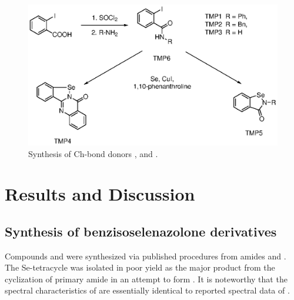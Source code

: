 \begin{refsection}
\begin{figure}
  \centering
  \includegraphics[scale=0.74]{Figures/catalytic-synthesis.eps}
  \caption{Synthesis of Ch-bond donors ,  and .}
  \label{fig:synthesis}
\end{figure}

\section{Results and Discussion}
\subsection{Synthesis of benzisoselenazolone derivatives }
Compounds  and  were synthesized via published procedures from amides  and .\autocite{Bhabak2010}
The Se-tetracycle  was isolated in poor yield as the major product from the cyclization of primary amide  in an attempt to form .
It is noteworthy that the spectral characteristics of  are essentially identical to reported spectral data of \autocite{Bhabak2010}.


\end{refsection}
